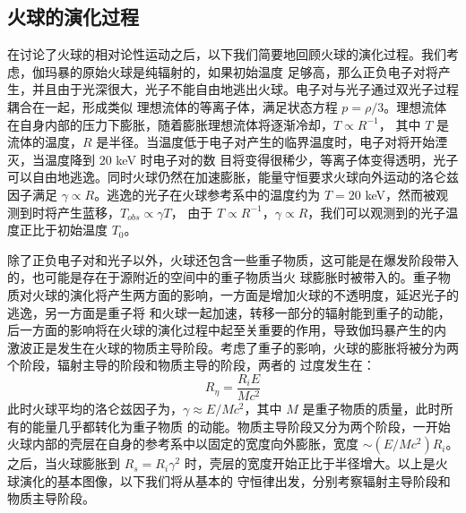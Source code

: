 	\subsection{火球的演化过程}

	在讨论了火球的相对论性运动之后，以下我们简要地回顾火球的演化过程。我们考虑，伽玛暴的原始火球是纯辐射的，如果初始温度
	足够高，那么正负电子对将产生，并且由于光深很大，光子不能自由地逃出火球。电子对与光子通过双光子过程耦合在一起，形成类似
	理想流体的等离子体，满足状态方程 $p=\rho/3$。理想流体在自身内部的压力下膨胀，随着膨胀理想流体将逐渐冷却，$T\propto R^{-1}$，
	其中 $T$ 是流体的温度，$R$ 是半径。当温度低于电子对产生的临界温度时，电子对将开始湮灭，当温度降到 $20$ keV 时电子对的数
	目将变得很稀少，等离子体变得透明，光子可以自由地逃逸。同时火球仍然在加速膨胀，能量守恒要求火球向外运动的洛仑兹因子满足
	$\gamma\propto R$。逃逸的光子在火球参考系中的温度约为 $T=20$ keV，然而被观测到时将产生蓝移，$T_{obs}\propto\gamma T$，
	由于 $T\propto R^{-1}$，$\gamma\propto R$，我们可以观测到的光子温度正比于初始温度 $T_{0}$。

	除了正负电子对和光子以外，火球还包含一些重子物质，这可能是在爆发阶段带入的，也可能是存在于源附近的空间中的重子物质当火
	球膨胀时被带入的。重子物质对火球的演化将产生两方面的影响，一方面是增加火球的不透明度，延迟光子的逃逸，另一方面是重子将
	和火球一起加速，转移一部分的辐射能到重子的动能，后一方面的影响将在火球的演化过程中起至关重要的作用，导致伽玛暴产生的内
	激波正是发生在火球的物质主导阶段。考虑了重子的影响，火球的膨胀将被分为两个阶段，辐射主导的阶段和物质主导的阶段，两者的
	过度发生在：
	\begin{equation}
	R_{\eta}=\frac{R_{i}E}{Mc^{2}}
	\end{equation}
	此时火球平均的洛仑兹因子为，$\gamma\approx E/Mc^{2}$，其中 $M$ 是重子物质的质量，此时所有的能量几乎都转化为重子物质
	的动能。物质主导阶段又分为两个阶段，一开始火球内部的壳层在自身的参考系中以固定的宽度向外膨胀，宽度 $\sim(E/Mc^{2})R_{i}$。
	之后，当火球膨胀到 $R_{s}=R_{i}\gamma^{2}$ 时，壳层的宽度开始正比于半径增大。以上是火球演化的基本图像，以下我们将从基本的
	守恒律出发，分别考察辐射主导阶段和物质主导阶段。


